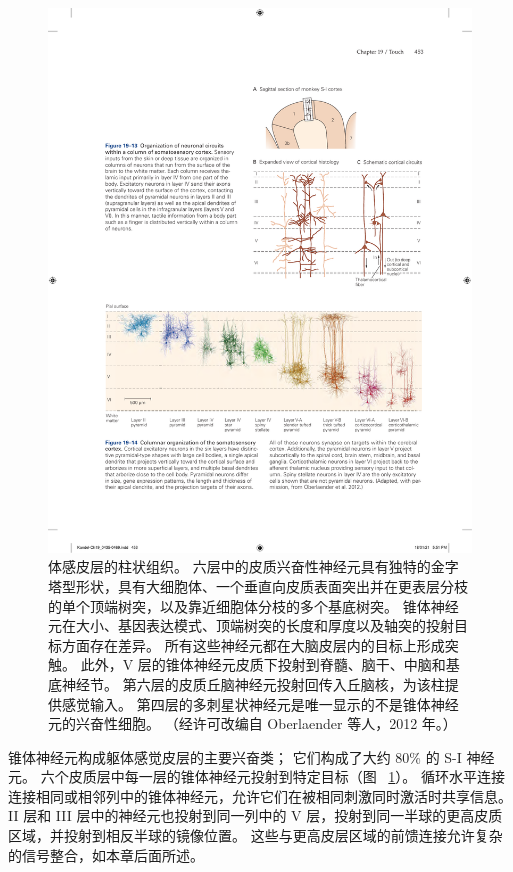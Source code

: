 \begin{figure}[htbp]
	\centering
	\includegraphics[width=1.0\linewidth]{chap19/fig_19_14}
	\caption{体感皮层的柱状组织。
		六层中的皮质兴奋性神经元具有独特的金字塔型形状，具有大细胞体、一个垂直向皮质表面突出并在更表层分枝的单个顶端树突，以及靠近细胞体分枝的多个基底树突。
		锥体神经元在大小、基因表达模式、顶端树突的长度和厚度以及轴突的投射目标方面存在差异。
		所有这些神经元都在大脑皮层内的目标上形成突触。 
		此外，V 层的锥体神经元皮质下投射到脊髓、脑干、中脑和基底神经节。
		第六层的皮质丘脑神经元投射回传入丘脑核，为该柱提供感觉输入。
		第四层的多刺星状神经元是唯一显示的不是锥体神经元的兴奋性细胞。 （经许可改编自 Oberlaender 等人，2012 年。）}
	\label{fig:19_14}
\end{figure}


锥体神经元构成躯体感觉皮层的主要兴奋类；
它们构成了大约 80\% 的 S-I 神经元。 
六个皮质层中每一层的锥体神经元投射到特定目标（图 ~\ref{fig:19_14}）。
循环水平连接连接相同或相邻列中的锥体神经元，允许它们在被相同刺激同时激活时共享信息。
II 层和 III 层中的神经元也投射到同一列中的 V 层，投射到同一半球的更高皮质区域，并投射到相反半球的镜像位置。
这些与更高皮层区域的前馈连接允许复杂的信号整合，如本章后面所述。


